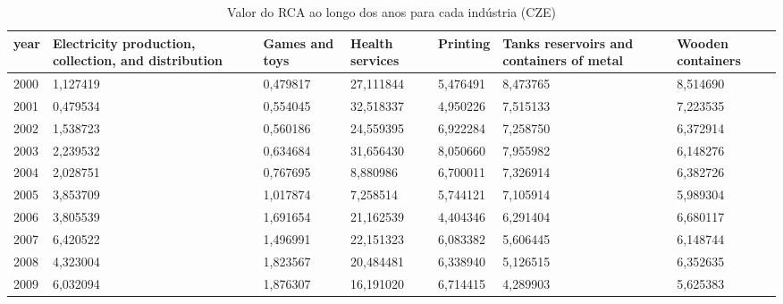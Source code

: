 \begin{table}
\centering
\caption{Valor do RCA ao longo dos anos para cada indústria (CZE)}
\begin{tabular}{p{1cm}p{2cm}p{2cm}p{2cm}p{2cm}p{2cm}p{2cm}}
\toprule
 year &  Electricity production, collection, and distribution &  Games and toys &  Health services &  Printing &  Tanks reservoirs and containers of metal &  Wooden containers \\
\midrule
 2000 &                                           1,127419 &        0,479817 &        27,111844 &  5,476491 &                                  8,473765 &           8,514690 \\
 2001 &                                           0,479534 &        0,554045 &        32,518337 &  4,950226 &                                  7,515133 &           7,223535 \\
 2002 &                                           1,538723 &        0,560186 &        24,559395 &  6,922284 &                                  7,258750 &           6,372914 \\
 2003 &                                           2,239532 &        0,634684 &        31,656430 &  8,050660 &                                  7,955982 &           6,148276 \\
 2004 &                                           2,028751 &        0,767695 &         8,880986 &  6,700011 &                                  7,326914 &           6,382726 \\
 2005 &                                           3,853709 &        1,017874 &         7,258514 &  5,744121 &                                  7,105914 &           5,989304 \\
 2006 &                                           3,805539 &        1,691654 &        21,162539 &  4,404346 &                                  6,291404 &           6,680117 \\
 2007 &                                           6,420522 &        1,496991 &        22,151323 &  6,083382 &                                  5,606445 &           6,148744 \\
 2008 &                                           4,323004 &        1,823567 &        20,484481 &  6,338940 &                                  5,126515 &           6,352635 \\
 2009 &                                           6,032094 &        1,876307 &        16,191020 &  6,714415 &                                  4,289903 &           5,625383 \\

\end{tabular}
\end{table}
